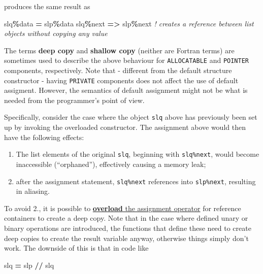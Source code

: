 \documentclass[
  paper=a4,
  ,captions=tableheading
]{scrartcl}
\newenvironment{Shaded}{\begin{snugshade}}{\end{snugshade}}
\newcommand{\CommentTok}[1]{\textcolor[rgb]{0.56,0.35,0.01}{\textit{#1}}}
\newcommand{\KeywordTok}[1]{\textcolor[rgb]{0.13,0.29,0.53}{\textbf{#1}}}
\newcommand{\NormalTok}[1]{#1}
\newcommand{\OperatorTok}[1]{\textcolor[rgb]{0.81,0.36,0.00}{\textbf{#1}}}
\providecommand{\tightlist}{%
  \setlength{\itemsep}{0pt}\setlength{\parskip}{0pt}}
\begin{document}
produces the same result as

\begin{Shaded}
\begin{Highlighting}[]
\NormalTok{slq}\OperatorTok{\%}\NormalTok{data }\KeywordTok{=}\NormalTok{ slp}\OperatorTok{\%}\NormalTok{data}
\NormalTok{slq}\OperatorTok{\%}\NormalTok{next }\KeywordTok{=}\OperatorTok{\textgreater{}}\NormalTok{ slp}\OperatorTok{\%}\NormalTok{next  }\CommentTok{! creates a reference between list objects without copying any value}
\end{Highlighting}
\end{Shaded}

The terms \textbf{deep copy} and \textbf{shallow copy} (neither are
Fortran terms) are sometimes used to describe the above behaviour for
\texttt{ALLOCATABLE} and \texttt{POINTER} components, respectively. Note
that - different from the default structure constructor - having
\texttt{PRIVATE} components does not affect the use of default
assigment. However, the semantics of default assignment might not be
what is needed from the programmer's point of view.

Specifically, consider the case where the object \texttt{slq} above has
previously been set up by invoking the overloaded constructor. The
assignment above would then have the following effects:

\begin{enumerate}
\def\labelenumi{\arabic{enumi}.}
\tightlist
\item
  The list elements of the original \texttt{slq}, beginning with
  \texttt{slq\%next}, would become inaccessible (``orphaned''),
  effectively causing a memory leak;
\item
  after the assignment statement, \texttt{slq\%next} references into
  \texttt{slp\%next}, resulting in aliasing.
\end{enumerate}

To avoid 2., it is possible to
\href{https://en.wikipedia.org/wiki/Fortran_95_language_features\#Derived-data_types}{\textbf{overload}
the assignment operator} for reference containers to create a deep copy.
Note that in the case where defined unary or binary operations are
introduced, the functions that define these need to create deep copies
to create the result variable anyway, otherwise things simply don't
work. The downside of this is that in code like

\begin{Shaded}
\begin{Highlighting}[]
\NormalTok{slq }\KeywordTok{=}\NormalTok{ slp }\KeywordTok{//}\NormalTok{ slq}
\end{Highlighting}
\end{Shaded}
\end{document}
